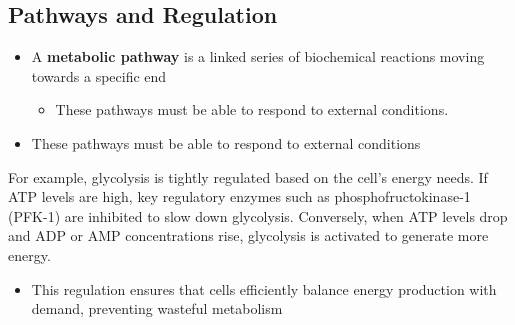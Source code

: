 \documentclass[10pt]{article}
\begin{document}
\subsection*{Pathways and Regulation}
\begin{itemize}
    \item A \textbf{metabolic pathway} is a linked series of biochemical reactions moving towards a specific end
    \begin{itemize}
        \item These pathways must be able to respond to external conditions.
    \end{itemize}
    \item These pathways must be able to respond to external conditions
\end{itemize}
For example, glycolysis is tightly regulated based on the cell's energy needs.  If ATP levels are high, key regulatory enzymes such as phosphofructokinase-1 (PFK-1) are inhibited to slow down glycolysis.  Conversely, when ATP levels drop and ADP or AMP concentrations rise, glycolysis is activated to generate more energy.
\begin{itemize}
    \item This regulation ensures that cells efficiently balance energy production with demand, preventing wasteful metabolism
\end{itemize}
\end{document}
